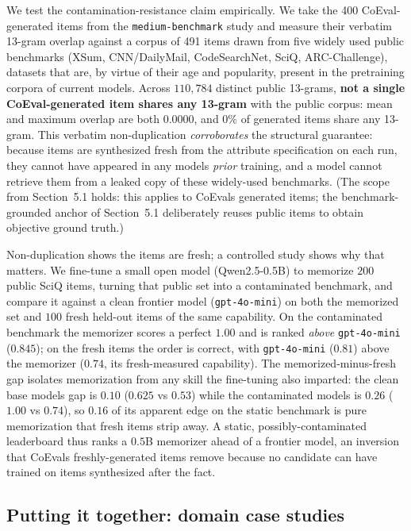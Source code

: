 We test the contamination-resistance claim empirically. We take the 400 CoEval-generated items from the
\texttt{medium-benchmark} study and measure their verbatim 13-gram overlap against a corpus of 491 items drawn
from five widely used public benchmarks (XSum, CNN/DailyMail, CodeSearchNet, SciQ, ARC-Challenge), datasets that
are, by virtue of their age and popularity, present in the pretraining corpora of current models. Across
\(110{,}784\) distinct public 13-grams, \textbf{not a single CoEval-generated item shares any 13-gram} with the
public corpus: mean and maximum overlap are both \(0.0000\), and \(0\%\) of generated items share any 13-gram. This
verbatim non-duplication \emph{corroborates} the structural guarantee: because items are synthesized fresh from the
attribute specification on each run, they cannot have appeared in any model\textquotesingle s \emph{prior} training, and a model
cannot retrieve them from a leaked copy of these widely-used benchmarks. (The scope from Section~5.1 holds: this
applies to CoEval\textquotesingle s generated items; the benchmark-grounded anchor of Section~5.1 deliberately reuses public items
to obtain objective ground truth.)

Non-duplication shows the items are fresh; a controlled study shows why that matters. We fine-tune a small open model
(Qwen2.5-0.5B) to memorize \(200\) public SciQ items, turning that public set into a contaminated benchmark, and compare
it against a clean frontier model (\texttt{gpt-4o-mini}) on both the memorized set and \(100\) fresh held-out items
of the same capability. On the contaminated benchmark the memorizer scores a perfect \(1.00\) and is ranked
\emph{above} \texttt{gpt-4o-mini} (\(0.845\)); on the fresh items the order is correct, with
\texttt{gpt-4o-mini} (\(0.81\)) above the memorizer (\(0.74\), its fresh-measured capability). The
memorized-minus-fresh gap isolates memorization from any skill the fine-tuning also imparted: the clean base model\textquotesingle s
gap is \(0.10\) (\(0.625\) vs \(0.53\)) while the contaminated model\textquotesingle s is \(0.26\) (\(1.00\) vs \(0.74\)), so \(0.16\) of its
apparent edge on the static benchmark is pure memorization that fresh items strip away. A static, possibly-contaminated
leaderboard thus ranks a \(0.5\)B memorizer ahead of a frontier model, an inversion that CoEval\textquotesingle s freshly-generated
items remove because no candidate can have trained on items synthesized after the fact.

\subsection{Putting it together: domain case studies}\label{putting-it-together-domain-case-studies}


